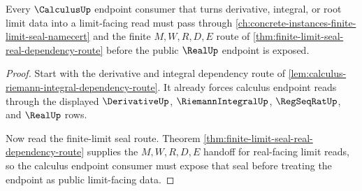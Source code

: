 \begin{lemma}
\label{lem:calculus-finite-limit-seal-route}
Every $\CalculusUp$ endpoint consumer that turns derivative, integral, or root
limit data into a limit-facing read must pass through
\autoref{ch:concrete-instances-finite-limit-seal-namecert} and the finite
$M,W,R,D,E$ route of \autoref{thm:finite-limit-seal-real-dependency-route}
before the public $\RealUp$ endpoint is exposed.
\end{lemma}
\begin{proof}
Start with the derivative and integral dependency route of
\autoref{lem:calculus-riemann-integral-dependency-route}. It already forces
calculus endpoint reads through the displayed $\DerivativeUp$,
$\RiemannIntegralUp$, $\RegSeqRatUp$, and $\RealUp$ rows.

Now read the finite-limit seal route. Theorem
\autoref{thm:finite-limit-seal-real-dependency-route} supplies the
$M,W,R,D,E$ handoff for real-facing limit reads, so the calculus endpoint
consumer must expose that seal before treating the endpoint as public
limit-facing data.
\end{proof}
